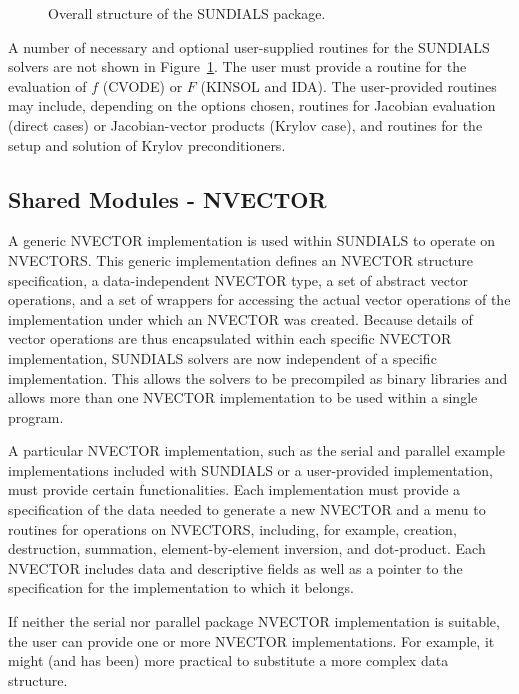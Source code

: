 \begin{figure}[tp]
\centerline{}
\caption{Overall structure of the SUNDIALS  package.}
\label{fig-sunorg}
\end{figure}

A number of necessary and optional user-supplied routines for the SUNDIALS
solvers are not shown in \mbox{Figure \ref{fig-sunorg}}. The user must
provide a routine for the evaluation of $f$ (CVODE) or $F$ (KINSOL and
IDA). The user-provided routines may include, depending on the options
chosen, routines for Jacobian evaluation (direct cases) or Jacobian-vector
products (Krylov case), and routines for the setup and solution of Krylov
preconditioners.

\subsection{Shared Modules - NVECTOR}

A generic NVECTOR implementation is used within SUNDIALS to
operate on NVECTORS. This generic implementation defines an NVECTOR
structure specification, a data-independent NVECTOR type, a set of abstract
vector operations, and a set of wrappers for accessing the actual vector
operations of the implementation under which an NVECTOR was created. Because
details of vector operations are thus encapsulated within each specific
NVECTOR implementation, SUNDIALS solvers are now independent of a specific
implementation. This allows the solvers to be precompiled as binary
libraries and allows more than one NVECTOR implementation to be used within
a single program.

A particular NVECTOR implementation, such as the serial and parallel example
implementations included with SUNDIALS or a user-provided implementation,
must provide certain functionalities. Each implementation must provide a
specification of the data needed to generate a new NVECTOR and a menu to
routines for operations on NVECTORS, including, for example, creation,
destruction, summation, element-by-element inversion, and dot-product. Each
NVECTOR includes data and descriptive fields as well as a pointer to the
specification for the implementation to which it belongs.

If neither the serial nor parallel package NVECTOR implementation is
suitable, the user can provide one or more NVECTOR implementations.  For
example, it might (and has been) more practical to substitute a more complex
data structure.


